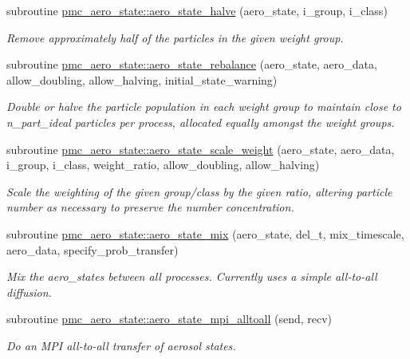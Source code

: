 \begin{DoxyCompactItemize}
subroutine \mbox{\hyperlink{namespacepmc__aero__state_ac5109f61fd1f0631a218a410154da5c1}{pmc\+\_\+aero\+\_\+state\+::aero\+\_\+state\+\_\+halve}} (aero\+\_\+state, i\+\_\+group, i\+\_\+class)
\begin{DoxyCompactList}\small\item\em Remove approximately half of the particles in the given weight group. \end{DoxyCompactList}\item 
subroutine \mbox{\hyperlink{namespacepmc__aero__state_a166b2bd2407e5342dd3c5a45b0ba421e}{pmc\+\_\+aero\+\_\+state\+::aero\+\_\+state\+\_\+rebalance}} (aero\+\_\+state, aero\+\_\+data, allow\+\_\+doubling, allow\+\_\+halving, initial\+\_\+state\+\_\+warning)
\begin{DoxyCompactList}\small\item\em Double or halve the particle population in each weight group to maintain close to {\ttfamily n\+\_\+part\+\_\+ideal} particles per process, allocated equally amongst the weight groups. \end{DoxyCompactList}\item 
subroutine \mbox{\hyperlink{namespacepmc__aero__state_ac4ca03b5c8c9684e8442edc2df12a020}{pmc\+\_\+aero\+\_\+state\+::aero\+\_\+state\+\_\+scale\+\_\+weight}} (aero\+\_\+state, aero\+\_\+data, i\+\_\+group, i\+\_\+class, weight\+\_\+ratio, allow\+\_\+doubling, allow\+\_\+halving)
\begin{DoxyCompactList}\small\item\em Scale the weighting of the given group/class by the given ratio, altering particle number as necessary to preserve the number concentration. \end{DoxyCompactList}\item 
subroutine \mbox{\hyperlink{namespacepmc__aero__state_a3c40aa98c11c8dfe6e662f2bbd8672e9}{pmc\+\_\+aero\+\_\+state\+::aero\+\_\+state\+\_\+mix}} (aero\+\_\+state, del\+\_\+t, mix\+\_\+timescale, aero\+\_\+data, specify\+\_\+prob\+\_\+transfer)
\begin{DoxyCompactList}\small\item\em Mix the aero\+\_\+states between all processes. Currently uses a simple all-\/to-\/all diffusion. \end{DoxyCompactList}\item 
subroutine \mbox{\hyperlink{namespacepmc__aero__state_ae546d85939653c1b2c7d52121d5f2bc6}{pmc\+\_\+aero\+\_\+state\+::aero\+\_\+state\+\_\+mpi\+\_\+alltoall}} (send, recv)
\begin{DoxyCompactList}\small\item\em Do an M\+PI all-\/to-\/all transfer of aerosol states. \end{DoxyCompactList}\item 

\end{DoxyCompactItemize}
